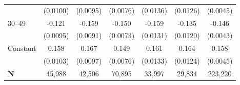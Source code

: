 {\begin{tabular}{l*{6}{c}}
                    &    (0.0100)         &    (0.0095)         &    (0.0076)         &    (0.0136)         &    (0.0126)         &    (0.0045)         \\
\addlinespace
\hspace*{1em}30–49               &      -0.121\sym{***}&      -0.159\sym{***}&      -0.150\sym{***}&      -0.159\sym{***}&      -0.135\sym{***}&      -0.146\sym{***}\\
                    &    (0.0095)         &    (0.0091)         &    (0.0073)         &    (0.0131)         &    (0.0120)         &    (0.0043)         \\
\addlinespace
\hspace*{1em}Constant            &       0.158\sym{***}&       0.167\sym{***}&       0.149\sym{***}&       0.161\sym{***}&       0.164\sym{***}&       0.158\sym{***}\\
                    &    (0.0103)         &    (0.0097)         &    (0.0076)         &    (0.0133)         &    (0.0124)         &    (0.0045)         \\
\midrule
\textbf{N}          &      45,988         &      42,506         &      70,895         &      33,997         &      29,834         &     223,220         \\
\bottomrule
\end{tabular}
}
